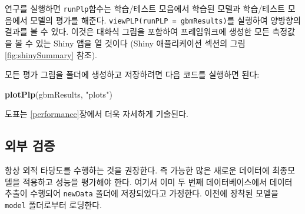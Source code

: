 \documentclass[10.5pt]{book}
\newenvironment{Shaded}{\begin{snugshade}}{\end{snugshade}}
\newcommand{\KeywordTok}[1]{\textcolor[rgb]{0.13,0.29,0.53}{\textbf{#1}}}
\newcommand{\StringTok}[1]{\textcolor[rgb]{0.31,0.60,0.02}{#1}}
\newcommand{\NormalTok}[1]{#1}
\theoremstyle{definition}
\theoremstyle{definition}
\theoremstyle{definition}
\theoremstyle{remark}
\begin{document}
연구를 실행하면 \texttt{runPlp}함수는 학습/테스트 모음에서 학습된 모델과
학습/테스트 모음에서 모델의 평가를 해준다.
\texttt{viewPLP(runPLP\ =\ gbmResults)}를 실행하여 양방향의 결과를 볼 수
있다. 이것은 대화식 그림을 포함하여 프레임워크에 생성한 모든 측정값을 볼
수 있는 Shiny 앱을 열 것이다 (Shiny 애플리케이션 섹션의 그림
\ref{fig:shinySummary} 참조).

모든 평가 그림을 폴더에 생성하고 저장하려면 다음 코드를 실행하면 된다:

\begin{Shaded}
\begin{Highlighting}[]
\KeywordTok{plotPlp}\NormalTok{(gbmResults, }\StringTok{"plots"}\NormalTok{)}
\end{Highlighting}
\end{Shaded}

도표는 \ref{performance}장에서 더욱 자세하게 기술된다.

\subsection{외부 검증}\label{-}

항상 외적 타당도를 수행하는 것을 권장한다. 즉 가능한 많은 새로운
데이터에 최종모델을 적용하고 성능을 평가해야 한다. 여기서 이미 두 번째
데이터베이스에서 데이터 추출이 수행되어 \texttt{newData} 폴더에
저장되었다고 가정한다. 이전에 장착된 모델을 \texttt{model} 폴더로부터
로딩한다.
\end{document}
